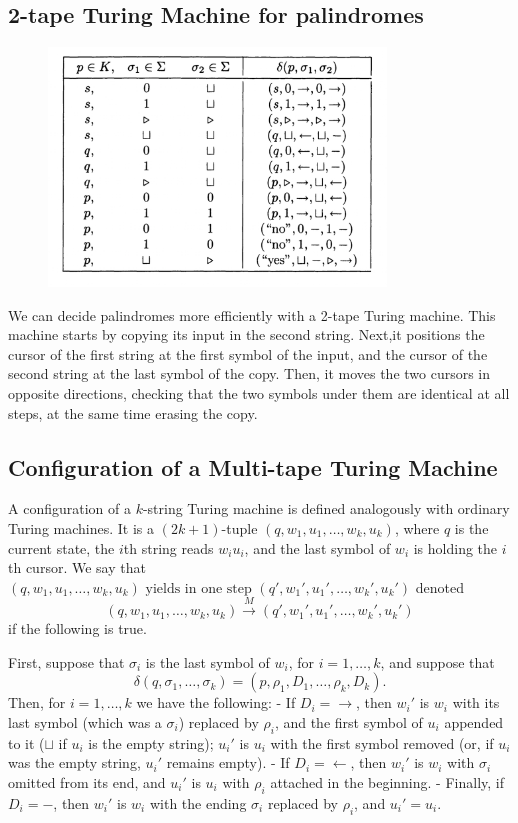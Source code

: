 \documentclass[12pt]{article}
\begin{document}
\subsection{2-tape Turing Machine for palindromes}
  \begin{figure}[ht]
    \centering
    \includegraphics[width=0.8\textwidth]{img/2kTM_palindrom.png}
  \end{figure}
  We can decide palindromes more efficiently with a 2-tape Turing machine. This machine starts by copying its input in the second string. Next,it positions the cursor of the first string at the first symbol of the input, and the cursor of the second string at the last symbol of the copy. Then, it moves the two cursors in opposite directions, checking that the two symbols under them are identical at all steps, at the same time erasing the copy.
  

\subsection{Configuration of a Multi-tape Turing Machine}

A configuration of a $k$-string Turing machine is defined analogously with ordinary Turing machines. It is a $(2k + 1)$-tuple $(q, w_1, u_1, \ldots, w_k, u_k)$, where $q$ is the current state, the $i$th string reads $w_i u_i$, and the last symbol of $w_i$ is holding the $i$th cursor. We say that 
$(q, w_1, u_1, \ldots, w_k, u_k) \text{ yields in one step } (q', w_1', u_1', \ldots, w_k', u_k')$ denoted 
$$(q, w_1, u_1, \ldots, w_k, u_k) \xrightarrow{M} (q', w_1', u_1', \ldots, w_k', u_k')$$
if the following is true. 

First, suppose that $\sigma_i$ is the last symbol of $w_i$, for $i = 1, \ldots, k$, and suppose that 
\[
\delta(q, \sigma_1, \ldots, \sigma_k) = (p, \rho_1, D_1, \ldots, \rho_k, D_k).
\]
Then, for $i = 1, \ldots, k$ we have the following:
- If $D_i = \rightarrow$, then $w_i'$ is $w_i$ with its last symbol (which was a $\sigma_i$) replaced by $\rho_i$, and the first symbol of $u_i$ appended to it ($\sqcup$ if $u_i$ is the empty string); $u_i'$ is $u_i$ with the first symbol removed (or, if $u_i$ was the empty string, $u_i'$ remains empty).
- If $D_i = \leftarrow$, then $w_i'$ is $w_i$ with $\sigma_i$ omitted from its end, and $u_i'$ is $u_i$ with $\rho_i$ attached in the beginning.
- Finally, if $D_i = -$, then $w_i'$ is $w_i$ with the ending $\sigma_i$ replaced by $\rho_i$, and $u_i' = u_i$.
\end{document}
